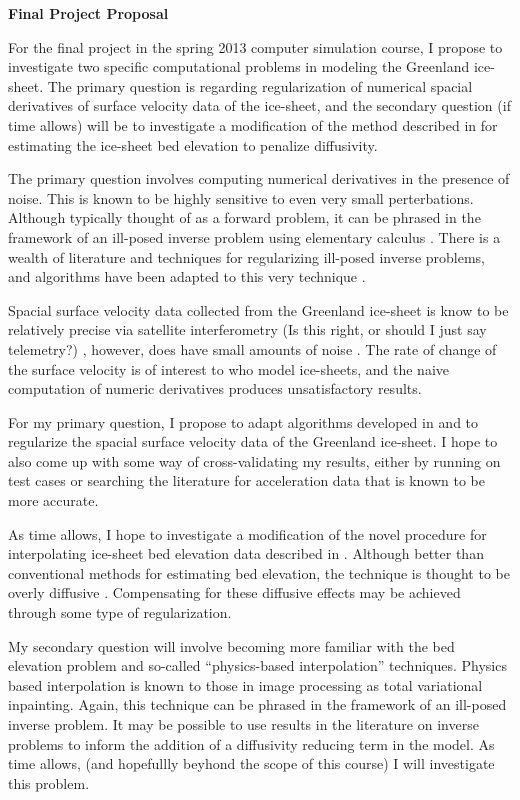 \documentclass{homework}
\begin{document}
{\LARGE\bf Final Project Proposal}
\vspace{1cm}

For the final project in the spring 2013 computer simulation course, I propose
to investigate two specific computational problems in modeling the Greenland
ice-sheet.  The primary question is regarding regularization of numerical
spacial derivatives of surface velocity data of the ice-sheet, and the
secondary question (if time allows) will be to investigate a modification of
the method described in \cite{johnson} for estimating the ice-sheet bed
elevation to penalize diffusivity.

The primary question involves computing numerical derivatives in the presence
of noise.  This is known \cite{hanke} to be highly sensitive to even very small
perterbations.  Although typically thought of as a forward problem, it can
be phrased in the framework of an ill-posed inverse problem using elementary
calculus \cite{hanke}.   There is a wealth of literature and techniques for regularizing
ill-posed inverse problems, and algorithms have been adapted to this very
technique \cite{knowles} \cite{chartrand}.   

Spacial surface velocity data collected from the Greenland ice-sheet is know to
be relatively precise via satellite interferometry (Is this right, or should I
just say telemetry?) , however, does have small amounts of noise\cite{unknown}
.  The rate of change of the surface velocity is of interest to who model
ice-sheets, and the naive computation of numeric derivatives produces
unsatisfactory results.  

For my primary question, I propose to adapt algorithms developed in
\cite{hanke} and \cite{chartrand} to regularize the spacial surface velocity
data of the Greenland ice-sheet.  I hope to also come up with some way of
cross-validating my results, either by running on test cases or searching the
literature for acceleration data that is known to be more accurate.

As time allows, I hope to investigate a modification of the novel procedure for
interpolating ice-sheet bed elevation data described in \cite{johnson}.
Although better than conventional methods for estimating bed elevation, the
technique is thought to be overly diffusive \cite{johnson}.  Compensating for
these diffusive effects may be achieved through some type of regularization.

My secondary question will involve becoming more familiar with the bed
elevation problem and so-called ``physics-based interpolation'' techniques.
Physics based interpolation is known to those in image processing as total
variational inpainting.  Again, this technique can be phrased in the framework
of an ill-posed inverse problem.  It may be possible to use results in the
literature on inverse problems to inform the addition of a diffusivity reducing
term in the model.  As time allows, (and hopefullly beyhond the scope of this
course) I will investigate this problem.
\end{document}
